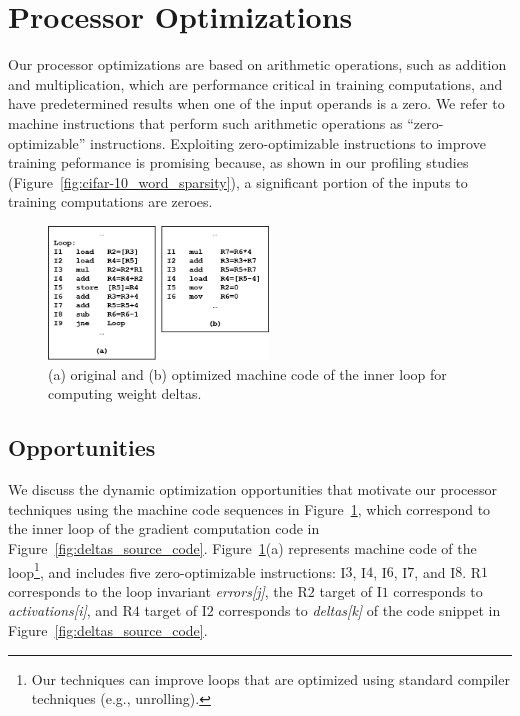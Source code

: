 \section{Processor Optimizations}
\label{sec:processor_opt}

Our processor optimizations are based on arithmetic operations, such as addition and multiplication, which are performance critical in training computations, and have predetermined results when one of the input operands is a zero. We refer to machine instructions that perform such arithmetic operations as ``zero-optimizable'' instructions. Exploiting zero-optimizable instructions to improve training peformance is promising because, as shown in our profiling studies (Figure~\ref{fig:cifar-10_word_sparsity}), a significant portion of the inputs to training computations are zeroes. 

\begin{figure}
\centering
\includegraphics[height=1.4in, width=.9\columnwidth]{Figures/gradient_machine_code.png}
\caption{(a) original and (b) optimized machine code of the inner loop for computing weight deltas.}
\label{fig:deltas_code_opt}
\end{figure}

\subsection{Opportunities}

We discuss the dynamic optimization opportunities that motivate our processor techniques using the machine code sequences in Figure~\ref{fig:deltas_code_opt}, which correspond to the inner loop of the gradient computation code in Figure~\ref{fig:deltas_source_code}.    Figure~\ref{fig:deltas_code_opt}(a) represents machine code of the loop\footnote{Our techniques can improve loops that are optimized using standard compiler techniques (e.g., unrolling).}, and includes five zero-optimizable instructions: I$3$, I$4$, I$6$, I$7$, and I$8$.  
R$1$ corresponds to the loop invariant \emph{errors[j]}, the R$2$ target of I$1$ corresponds to \emph{activations[i]}, and R$4$ target of I$2$ corresponds to \emph{deltas[k]} of the code snippet in Figure~\ref{fig:deltas_source_code}.

